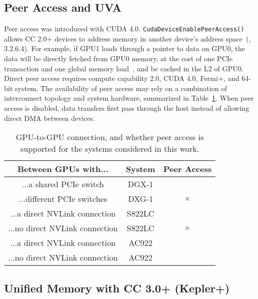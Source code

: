 \subsection{Peer Access and UVA}
\label{sec:cuda-peer}



Peer access was introduced with CUDA 4.0.
\texttt{CudaDeviceEnablePeerAccess()} allows CC 2.0+ devices to address memory in another device's address space~(\cite{nvidia2011cudac40}, 3.2.6.4).
For example, if GPU1 loads through a pointer to data on GPU0, the data will be directly fetched from GPU0 memory, at the cost of one PCIe transaction and one global memory load~\cite{schroeder2011peer}, and be cached in the L2 of GPU0.
Direct peer access requires compute capability 2.0, CUDA 4.0, Fermi+, and 64-bit system.
The availability of peer access may rely on a combination of interconnect topology and system hardware, summarized in Table~\ref{tab:cuda-peer-topology}.
When peer access is disabled, data transfers first pass through the host instead of allowing direct DMA between devices.

\begin{table}[ht]
	\centering
	\caption[System support for GPU-GPU peer access]{
		GPU-to-GPU connection, and whether peer access is supported for the systems considered in this work.
	}
	\label{tab:cuda-peer-topology}
	\begin{tabular}{ccc}
		\hline
		\textbf{Between GPUs with...}  & \textbf{System} &  \textbf{Peer Access} \\ \hline
		...a shared PCIe switch        & DGX-1           &  \checkmark           \\ \hline
		...different PCIe switches     & DXG-1           &  $\times$             \\ \hline
		...a direct NVLink connection  & S822LC          &  \checkmark           \\ \hline
		...no direct NVLink connection & S822LC          &  $\times$             \\ \hline
		...a direct NVLink connection  & AC922           &  \checkmark           \\ \hline
		...no direct NVLink connection & AC922           &  \checkmark           \\ \hline

	\end{tabular}
\end{table}

\subsection{Unified Memory with CC 3.0+ (Kepler+)}
\label{sec:unified-cc3}

